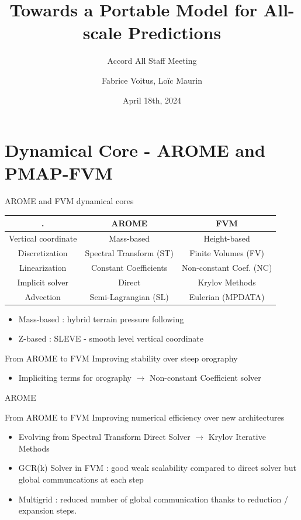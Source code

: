 \documentclass{beamer}
\title[Accord All Staff Meeting]{Towards a Portable Model for All-scale Predictions}
\subtitle{Accord All Staff Meeting}
\author{Fabrice Voitus, Loïc Maurin}
\institute[CNRM]{Centre National de Recherche Météorologique}
\date{April 18th, 2024}
\begin{document}
\frame{\titlepage}
\section{Dynamical Core - AROME and PMAP-FVM}

\begin{frame}{AROME and FVM dynamical cores}
    \begin{center}
        \begin{tabular}{|c|c|c|}
            \hline
             . & AROME & FVM \\
            \hline
            Vertical coordinate & Mass-based & Height-based  \\
            \hline
            Discretization & Spectral Transform (ST) & Finite Volumes (FV)\\
            \hline
            Linearization & Constant Coefficients & Non-constant Coef. (NC) \\
            \hline
            Implicit solver & Direct & Krylov Methods \\
            \hline 
            Advection & Semi-Lagrangian (SL) & Eulerian (MPDATA)\\
            \hline 
        \end{tabular}
    \end{center}

    \begin{itemize}
        \item Mass-based : hybrid terrain pressure following
        \item Z-based : SLEVE - smooth level vertical coordinate
    \end{itemize}

\end{frame}

\begin{frame}{From AROME to FVM}
    Improving stability over steep orography
    \begin{itemize}
        \item Impliciting terms for orography $\rightarrow$ Non-constant Coefficient solver
    \end{itemize}

    AROME   
\end{frame}

\begin{frame}{From AROME to FVM}
    Improving numerical efficiency over new architectures 
    \begin{itemize}
        \item Evolving from Spectral Transform Direct Solver $\rightarrow$ Krylov Iterative Methods
        \item GCR(k) Solver in FVM : good weak scalability compared to direct solver but global communcations at each step
        \item Multigrid : reduced number of global communication thanks to reduction / expansion steps.
    \end{itemize}

\end{frame}
\end{document}
